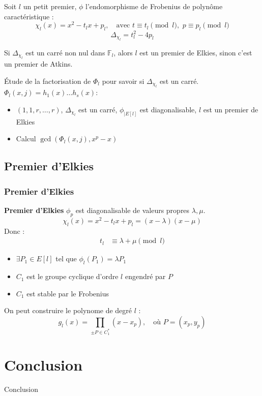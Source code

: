\documentclass[french]{beamer}
\begin{document}
\begin{frame}
Soit $l$ un petit premier, $\phi$ l'endomorphisme de Frobenius de polynôme caractéristique :
$$\chi_l(x) = x^2 - t_lx +p_l, \quad \text{avec } t \equiv t_l \pmod l , \, \,p \equiv p_l \pmod l$$ 
\newline 
$$\Delta_{\chi_l} = t_l^2 -4p_l $$
\begin{definition}
Si $\Delta_{\chi_l}$ est un carré non nul dans $\mathbb{F}_l$, alors $l$ est un premier de Elkies, sinon c'est un premier de Atkins.
\end{definition}
Étude de la factorisation de $\Phi_l$ pour savoir si $\Delta_{\chi_l}$ est un carré. 
\newline
$\Phi_l(x,j) = h_1(x)\ldots h_s(x)$:
\begin{itemize}
\item $(1,1,r,\ldots,r)$, $\Delta_{\chi_l}$ est un carré, $\phi_{|E[l]}$ est diagonalisable, $l$ est un premier de Elkies
\item Calcul $\gcd(\Phi_l(x,j), x^p - x)$
\end{itemize}
\end{frame}
\subsection{Premier d'Elkies}
\begin{frame}
\frametitle{Premier d'Elkies}
\textbf{Premier d'Elkies}
\newline
$\phi_p$ est diagonalisable de valeurs propres $\lambda, \mu$. 
$$\chi_l(x) = x^2 - t_lx +p_l =(x-\lambda)(x-\mu)$$
Donc :
\begin{align*}
t_l &\equiv \lambda + \mu \pmod l
\end{align*}
\begin{itemize}
\item $\exists P_1 \in E[l]$ tel que $\phi_l(P_1) = \lambda P_1$
\item $C_1$ est le groupe cyclique d'ordre $l$ engendré par $P$
\item $C_1$ est stable par le Frobenius 
\end{itemize}
On peut construire le polynome de degré $l$ :
$$ g_l(x) = \prod_{\pm P \in C_1^*} (x - x_p), \quad \text{où } P = (x_p, y_p) $$
\end{frame}

\section{Conclusion}
\begin{frame}
\begin{center}
\huge Conclusion
\end{center}

\end{frame}
\end{document}
